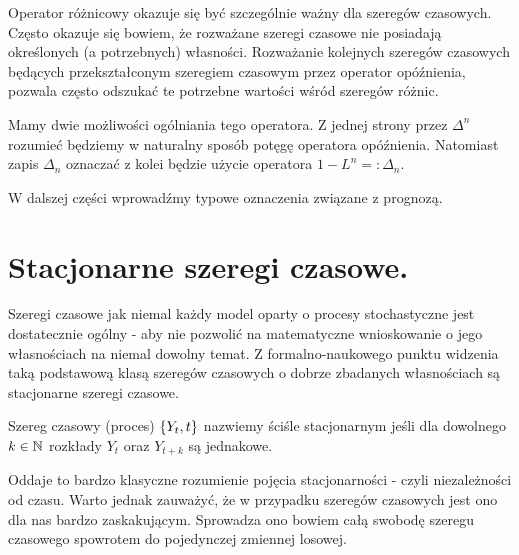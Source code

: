 \documentclass[10pt,a4paper]{book}
\begin{document}
Operator różnicowy okazuje się być szczególnie ważny dla szeregów czasowych. Często okazuje się bowiem, że rozważane szeregi czasowe nie posiadają określonych (a potrzebnych) własności. Rozważanie kolejnych szeregów czasowych będących przekształconym szeregiem czasowym przez operator opóźnienia, pozwala często odszukać te potrzebne wartości wśród szeregów różnic.

Mamy dwie możliwości ogólniania tego operatora. Z jednej strony przez $\Delta^n$ rozumieć będziemy w naturalny sposób potęgę operatora opóźnienia. Natomiast zapis $\Delta_n$ oznaczać z kolei będzie użycie operatora $1 - L^n =: \Delta_n$.

W dalszej części wprowadźmy typowe oznaczenia związane z prognozą.

\section{Stacjonarne szeregi czasowe.}

Szeregi czasowe jak niemal każdy model oparty o procesy stochastyczne jest dostatecznie ogólny - aby nie pozwolić na matematyczne wnioskowanie o jego własnościach na niemal dowolny temat. Z formalno-naukowego punktu widzenia taką podstawową klasą szeregów czasowych o dobrze zbadanych własnościach są stacjonarne szeregi czasowe.  

\begin{definition}
Szereg czasowy (proces) $\left\lbrace {{Y_t}, {t}} \right\rbrace$ nazwiemy ściśle stacjonarnym jeśli dla dowolnego $k \in \mathbb{N}$ rozkłady $Y_t$ oraz $Y_{t+k}$ są jednakowe.
\end{definition}

Oddaje to bardzo klasyczne rozumienie pojęcia stacjonarności - czyli niezależności od czasu. Warto jednak zauważyć, że w przypadku szeregów czasowych jest ono dla nas bardzo zaskakującym. Sprowadza ono bowiem całą swobodę szeregu czasowego spowrotem do pojedynczej zmiennej losowej. 
\end{document}
